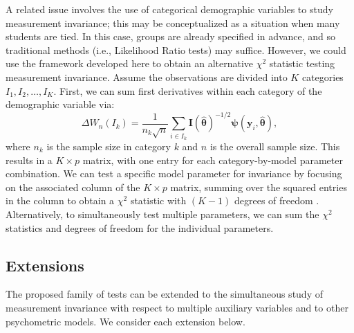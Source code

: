 \documentclass[man]{apa}
\begin{document}
A related issue involves the use of categorical demographic
variables to study measurement invariance; this may be conceptualized
as a situation when many students are tied.  In this case, groups are
already specified in advance, and so traditional methods (i.e.,
Likelihood Ratio tests) may suffice.
However, we could use the framework developed here to obtain an
alternative $\chi^2$ statistic testing measurement invariance.
Assume the observations are divided into $K$ categories $I_1, I_2,
\ldots, I_K$.
First, we can sum first derivatives within each category of the
demographic variable via:
\begin{equation}
    \label{eq:catsum}
    \Delta W_n(I_k) = \frac{1}{n_k\sqrt{n}} \sum_{i \in I_k}
    {\bm{I}}(\widehat{\bm{\theta}})^{-1/2} {\bm{\psi}}({\bm{y}}_i, \widehat{{\bm
      \theta}}),
\end{equation}
where $n_k$ is the sample size in category $k$ and $n$ is the overall
sample size.  This results in a $K \times p$ matrix, with one entry for
each category-by-model parameter combination.  We can test
a specific model parameter for invariance by focusing on the associated
column of the $K \times p$ matrix, summing over the squared entries in
the column to obtain a $\chi^2$ statistic with
$(K-1)$ degrees of freedom \cite{HjoKon02}.
Alternatively, to simultaneously test multiple parameters, we can sum
the $\chi^2$ statistics and degrees of freedom for the individual
parameters.

\subsection{Extensions}
The proposed family of tests can be extended to the simultaneous study
of measurement invariance with 
respect to multiple auxiliary variables and to other psychometric
models.  We consider each extension below.

\end{document}

